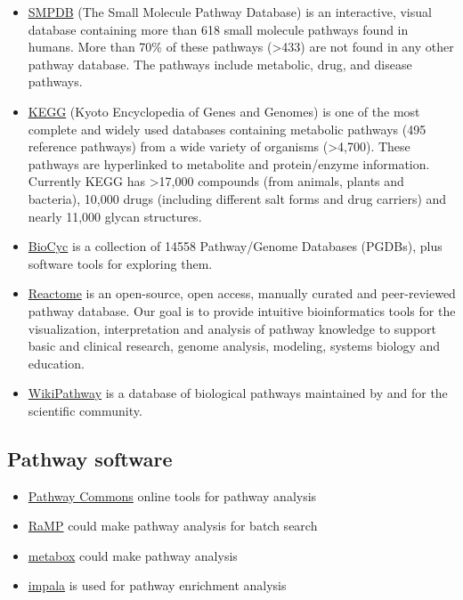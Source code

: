 \documentclass[
]{book}
\begin{document}
\begin{itemize}
\item
  \href{http://smpdb.ca/view}{SMPDB} (The Small Molecule Pathway Database) is an interactive, visual database containing more than 618 small molecule pathways found in humans. More than 70\% of these pathways (\textgreater433) are not found in any other pathway database. The pathways include metabolic, drug, and disease pathways.
\item
  \href{https://www.genome.jp/kegg/}{KEGG} (Kyoto Encyclopedia of Genes and Genomes) is one of the most complete and widely used databases containing metabolic pathways (495 reference pathways) from a wide variety of organisms (\textgreater4,700). These pathways are hyperlinked to metabolite and protein/enzyme information. Currently KEGG has \textgreater17,000 compounds (from animals, plants and bacteria), 10,000 drugs (including different salt forms and drug carriers) and nearly 11,000 glycan structures.
\item
  \href{https://biocyc.org/}{BioCyc} is a collection of 14558 Pathway/Genome Databases (PGDBs), plus software tools for exploring them.
\item
  \href{https://reactome.org/what-is-reactome}{Reactome} is an open-source, open access, manually curated and peer-reviewed pathway database. Our goal is to provide intuitive bioinformatics tools for the visualization, interpretation and analysis of pathway knowledge to support basic and clinical research, genome analysis, modeling, systems biology and education.
\item
  \href{https://www.wikipathways.org/index.php/WikiPathways}{WikiPathway} is a database of biological pathways maintained by and for the scientific community.
\end{itemize}

\hypertarget{pathway-software}{%
\subsection{Pathway software}\label{pathway-software}}

\begin{itemize}
\item
  \href{http://www.pathwaycommons.org/}{Pathway Commons} online tools for pathway analysis
\item
  \href{https://github.com/Mathelab/RaMP-DB}{RaMP} could make pathway analysis for batch search
\item
  \href{https://github.com/kwanjeeraw/metabox}{metabox} could make pathway analysis
\item
  \href{http://impala.molgen.mpg.de/}{impala} is used for pathway enrichment analysis
\end{itemize}
\end{document}
